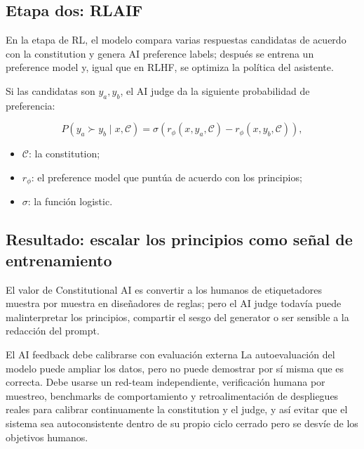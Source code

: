 \documentclass[a4paper]{article}
\begin{document}
\subsection{Etapa dos: RLAIF}

En la etapa de RL, el modelo compara varias respuestas candidatas de acuerdo con la constitution y genera AI preference labels; después se entrena un preference model y, igual que en RLHF, se optimiza la política del asistente.


Si las candidatas son $y_a,y_b$, el AI judge da la siguiente probabilidad de preferencia:

$$
P(y_a\succ y_b\mid x,\mathcal C)
=\sigma\!\left(r_\phi(x,y_a,\mathcal C)-r_\phi(x,y_b,\mathcal C)\right),
$$

\begin{itemize}
    \item $\mathcal C$: la constitution;
    \item $r_\phi$: el preference model que puntúa de acuerdo con los principios;
    \item $\sigma$: la función logistic.
\end{itemize}

\subsection{Resultado: escalar los principios como señal de entrenamiento}


El valor de Constitutional AI es convertir a los humanos de etiquetadores muestra por muestra en diseñadores de reglas; pero el AI judge todavía puede malinterpretar los principios, compartir el sesgo del generator o ser sensible a la redacción del prompt.

\begin{importantbox}{El AI feedback debe calibrarse con evaluación externa}
La autoevaluación del modelo puede ampliar los datos, pero no puede demostrar por sí misma que es correcta. Debe usarse un red-team independiente, verificación humana por muestreo, benchmarks de comportamiento y retroalimentación de despliegues reales para calibrar continuamente la constitution y el judge, y así evitar que el sistema sea autoconsistente dentro de su propio ciclo cerrado pero se desvíe de los objetivos humanos.
\end{importantbox}
\end{document}
